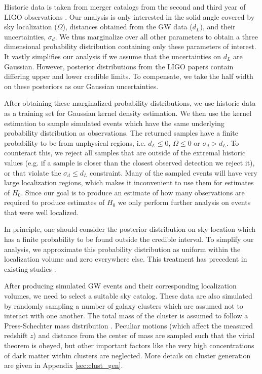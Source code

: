 
Historic data is taken from merger catalogs from the second and third year of LIGO observations \cite{GWTC_2,GWTC_3}. Our analysis is only interested in the solid angle covered by sky localization ($\Omega$), distances obtained from the GW data ($d_L$), and their uncertainties, $\sigma_d$. We thus marginalize over all other parameters to obtain a three dimensional probability distribution containing only these parameters of interest. It vastly simplifies our analysis if we assume that the uncertainties on $d_L$ are Gaussian. However, posterior distributions from the LIGO papers contain differing upper and lower credible limits. To compensate, we take the half width on these posteriors as our Gaussian uncertainties.

After obtaining these marginalized probability distributions, we use historic data as a training set for Gaussian kernel density estimation. We then use the kernel estimation to sample simulated events which have the same underlying probability distribution as observations. The returned samples have a finite probability to be from unphysical regions, i.e. $d_L \leq 0$, $\Omega\leq 0$ or $\sigma_d > d_L$. To counteract this, we reject all samples that are outside of the extremal historic values (e.g. if a sample is closer than the closest observed detection we reject it), or that violate the $\sigma_d \leq d_L$ constraint. Many of the sampled events will have very large localization regions, which makes it inconvenient to use them for estimates of $H_0$. Since our goal is to produce an estimate of how many observations are required to produce estimates of $H_0$ we only perform further analysis on events that were well localized.

In principle, one should consider the posterior distribution on sky location which has a finite probability to be found outside the credible interval. To simplify our analysis, we approximate this probability distribution as uniform within the localization volume and zero everywhere else. This treatment has precedent in existing studies \cite{Nair_2018, GW170814_DES}.

After producing simulated GW events and their corresponding localization volumes, we need to select a suitable sky catalog. These data are also simulated by randomly sampling a number of galaxy clusters which are assumed not to interact with one another. The total mass of the cluster is assumed to follow a Press-Schechter mass distribution \cite{Press_1974}. Peculiar motions (which affect the measured redshift $z$) and distance from the center of mass are sampled such that the virial theorem is obeyed, but other important factors like the very high concentrations of dark matter within clusters are neglected. More details on cluster generation are given in Appendix \ref{sec:clust_gen}.
    

